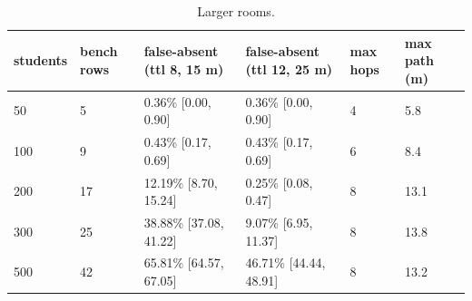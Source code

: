 \begin{table}[t]
\centering
\caption{Larger rooms.}\label{tab:e11}
\begin{tabular}{llllll}
\toprule
students & bench rows & false-absent (ttl 8, 15 m) & false-absent (ttl 12, 25 m) & max hops & max path (m) \\
\midrule
50 & 5 & 0.36\% [0.00, 0.90] & 0.36\% [0.00, 0.90] & 4 & 5.8 \\
100 & 9 & 0.43\% [0.17, 0.69] & 0.43\% [0.17, 0.69] & 6 & 8.4 \\
200 & 17 & 12.19\% [8.70, 15.24] & 0.25\% [0.08, 0.47] & 8 & 13.1 \\
300 & 25 & 38.88\% [37.08, 41.22] & 9.07\% [6.95, 11.37] & 8 & 13.8 \\
500 & 42 & 65.81\% [64.57, 67.05] & 46.71\% [44.44, 48.91] & 8 & 13.2 \\
\bottomrule
\end{tabular}
\end{table}
